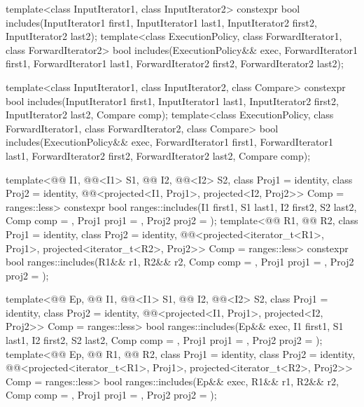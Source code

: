 %
\begin{itemdecl}
template<class InputIterator1, class InputIterator2>
  constexpr bool includes(InputIterator1 first1, InputIterator1 last1,
                          InputIterator2 first2, InputIterator2 last2);
template<class ExecutionPolicy, class ForwardIterator1, class ForwardIterator2>
  bool includes(ExecutionPolicy&& exec,
                ForwardIterator1 first1, ForwardIterator1 last1,
                ForwardIterator2 first2, ForwardIterator2 last2);

template<class InputIterator1, class InputIterator2, class Compare>
  constexpr bool includes(InputIterator1 first1, InputIterator1 last1,
                          InputIterator2 first2, InputIterator2 last2,
                          Compare comp);
template<class ExecutionPolicy, class ForwardIterator1, class ForwardIterator2, class Compare>
  bool includes(ExecutionPolicy&& exec,
                ForwardIterator1 first1, ForwardIterator1 last1,
                ForwardIterator2 first2, ForwardIterator2 last2,
                Compare comp);

template<@@ I1, @@<I1> S1, @@ I2, @@<I2> S2,
         class Proj1 = identity, class Proj2 = identity,
         @@<projected<I1, Proj1>,
                                    projected<I2, Proj2>> Comp = ranges::less>
  constexpr bool ranges::includes(I1 first1, S1 last1, I2 first2, S2 last2, Comp comp = {},
                                  Proj1 proj1 = {}, Proj2 proj2 = {});
template<@@ R1, @@ R2, class Proj1 = identity,
         class Proj2 = identity,
         @@<projected<iterator_t<R1>, Proj1>,
                                    projected<iterator_t<R2>, Proj2>> Comp = ranges::less>
  constexpr bool ranges::includes(R1&& r1, R2&& r2, Comp comp = {},
                                  Proj1 proj1 = {}, Proj2 proj2 = {});

template<@@ Ep, @@ I1, @@<I1> S1,
         @@ I2, @@<I2> S2,
         class Proj1 = identity, class Proj2 = identity,
         @@<projected<I1, Proj1>, projected<I2, Proj2>> Comp =
           ranges::less>
  bool ranges::includes(Ep&& exec, I1 first1, S1 last1, I2 first2, S2 last2,
                        Comp comp = {}, Proj1 proj1 = {}, Proj2 proj2 = {});
template<@@ Ep, @@ R1, @@ R2,
         class Proj1 = identity, class Proj2 = identity,
         @@<projected<iterator_t<R1>, Proj1>,
                                    projected<iterator_t<R2>, Proj2>> Comp = ranges::less>
  bool ranges::includes(Ep&& exec, R1&& r1, R2&& r2,
                        Comp comp = {}, Proj1 proj1 = {}, Proj2 proj2 = {});
\end{itemdecl}

